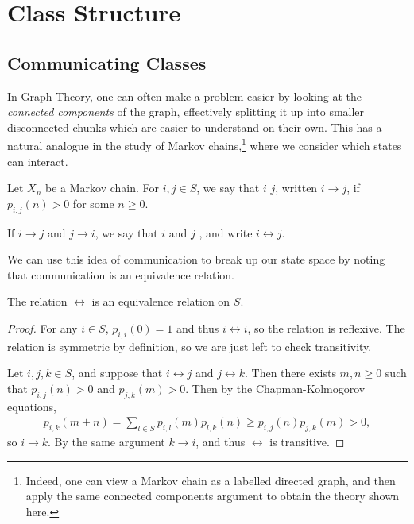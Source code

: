 \documentclass[a4paper]{scrartcl}
\begin{document}
\section{Class Structure}


\subsection{Communicating Classes}

In Graph Theory, one can often make a problem easier by looking at the \emph{connected components} of the graph, effectively splitting it up into smaller disconnected chunks which are easier to understand on their own. 
This has a natural analogue in the study of Markov chains,\footnote{Indeed, one can view a Markov chain as a labelled directed graph, and then apply the same connected components argument to obtain the theory shown here.} where we consider which states can interact.

\begin{definition}[Communication]
	Let $X_n$ be a Markov chain. For $i, j \in S$, we say that $i$  $j$, written $i \rightarrow j$, if $p_{i, j}(n) > 0$ for some $n \geq 0$.

	If $i \rightarrow j$ and $j \rightarrow i$, we say that $i$ and $j$ , and write $i \leftrightarrow j$.
\end{definition}

We can use this idea of communication to break up our state space by noting that communication is an equivalence relation.

\begin{theorem}
The relation $\leftrightarrow$ is an equivalence relation on $S$.
\end{theorem}
\begin{proof}
	For any $i \in S$, $p_{i, i}(0) = 1$ and thus $i \leftrightarrow i$, so the relation is reflexive. The relation is symmetric by definition, so we are just left to check transitivity.

	Let $i, j, k \in S$, and suppose that $i \leftrightarrow j$ and $j \leftrightarrow k$. Then there exists $m, n \geq 0$ such that $p_{i, j}(n) > 0$ and $p_{j, k}(m) > 0$. Then by the Chapman-Kolmogorov equations,
	\begin{align*}
		p_{i, k}(m + n) = \sum_{l \in S}p_{i, l}(m)p_{l, k}(n) \geq p_{i, j}(n) p_{j, k}(m) > 0,
	\end{align*}
	so $i \rightarrow k$. By the same argument $k \rightarrow i$, and thus $\leftrightarrow$ is transitive.
\end{proof}
\end{document}
